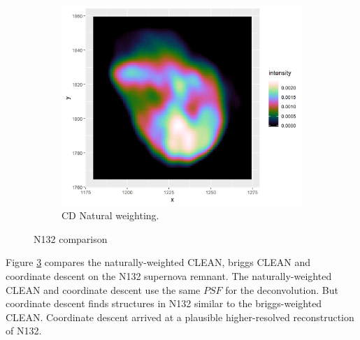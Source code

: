 \begin{figure}[h]
\begin{subfigure}[b]{0.3\linewidth}
		\label{results:N132:cleanbriggs}
	\end{subfigure}
	\begin{subfigure}[b]{0.3\linewidth}
		\includegraphics[width=1.00\linewidth]{./chapters/10.results/SerialCD/CD-N132.png}
		\caption{CD Natural weighting.}
		\label{results:comp:N132:cd}
	\end{subfigure}
	\caption{N132 comparison}
	\label{results:cleancomp::N132:figure}
\end{figure}

Figure \ref{results:cleancomp::N132:figure} compares the naturally-weighted CLEAN, briggs CLEAN and coordinate descent on the N132 supernova remnant. The naturally-weighted CLEAN and coordinate descent use the same $PSF$ for the deconvolution. But coordinate descent finds structures in N132 similar to the briggs-weighted CLEAN. Coordinate descent arrived at a plausible higher-resolved reconstruction of N132.

